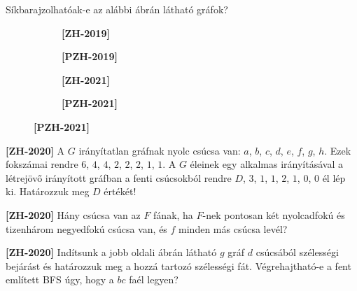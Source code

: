 \documentclass[a4paper, 12pt]{article}
\begin{document}
\begin{enumerate}
        \item Síkbarajzolhatóak-e az alábbi ábrán látható gráfok?
        \begin{figure}[!ht]
            \centering
            \begin{subfigure}{0.24\textwidth}
                \centering
                
                \caption{\textbf{[ZH-2019]}}
            \end{subfigure}
            \begin{subfigure}{0.24\textwidth}
                \centering
                
                \caption{\textbf{[PZH-2019]}}
            \end{subfigure}
            \begin{subfigure}{0.24\textwidth}
                \centering
                
                \caption{\textbf{[ZH-2021]}}
            \end{subfigure}
            \begin{subfigure}{0.24\textwidth}
                \centering
                
                \caption{\textbf{[PZH-2021]}}
            \end{subfigure}
        \end{figure}

        \item \textbf{[ZH-2020]} A $G$ irányítatlan gráfnak nyolc csúcsa van: $a$, $b$, $c$, $d$, $e$, $f$, $g$, $h$. Ezek fokszámai rendre $6$, $4$, $4$, $2$, $2$, $2$, $1$, $1$. A $G$ éleinek egy alkalmas irányításával a létrejövő irányított gráfban a fenti csúcsokból rendre $D$, $3$, $1$, $1$, $2$, $1$, $0$, $0$ él lép ki. Határozzuk meg $D$ értékét!
        \item \textbf{[ZH-2020]} Hány csúcsa van az $F$ fának, ha $F$-nek pontosan két nyolcadfokú és tizenhárom negyedfokú csúcsa van, és $f$ minden más csúcsa levél?
        
        \begin{minipage}{0.5\textwidth}
            \item \textbf{[ZH-2020]} Indítsunk a jobb oldali ábrán látható $g$ gráf $d$ csúcsából szélességi bejárást és határozzuk meg a hozzá tartozó szélességi fát. Végrehajtható-e a fent említett BFS úgy, hogy a $bc$ faél legyen?
        \end{minipage}\hfill
        \begin{minipage}{0.3\textwidth}
            \centering
            
        \end{minipage}


\end{enumerate}
\end{document}
